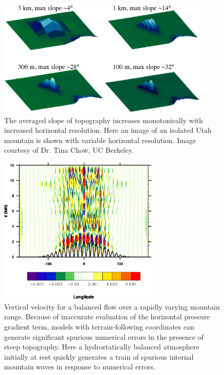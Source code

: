 \documentclass[11pt]{article}
\begin{document}
\begin{figure}
\begin{center}
\includegraphics[width=4in]{MountainSlopeResolution.png}
\end{center}
\caption{The averaged slope of topography increases monotonically with increased horizontal resolution.  Here an image of an isolated Utah mountain is shown with variable horizontal resolution.  Image courtesy of Dr. Tina Chow, UC Berkeley.} \label{fig:MountainSlopeResolution}
\end{figure}

\begin{figure}
\begin{center}
\includegraphics[width=3in]{SpuriousMountainNoise.png}
\end{center}
\caption{Vertical velocity for a balanced flow over a rapidly varying mountain range.  Because of inaccurate evaluation of the horizontal pressure gradient term, models with terrain-following coordinates can generate significant spurious numerical errors in the presence of steep topography.  Here a hydrostatically balanced atmosphere initially at rest quickly generates a train of spurious internal mountain waves in response to numerical errors.} \label{fig:SpuriousMountainNoise}
\end{figure}
\end{document}
